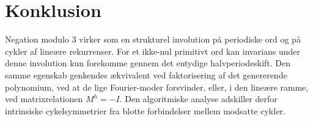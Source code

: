 \documentclass[11pt,a4paper]{article}
\begin{document}
\section*{Konklusion}
Negation modulo 3 virker som en strukturel involution på periodiske ord og på cykler af lineære rekurrenser. For et ikke-nul primitivt ord kan invarians under denne involution kun forekomme gennem det entydige halvperiodeskift. Den samme egenskab genkendes ækvivalent ved faktorisering af det genererende polynomium, ved at de lige Fourier-moder forsvinder, eller, i den lineære ramme, ved matrixrelationen $M^h=-I$. Den algoritmiske analyse adskiller derfor intrinsiske cykelsymmetrier fra blotte forbindelser mellem modsatte cykler.
\end{document}
